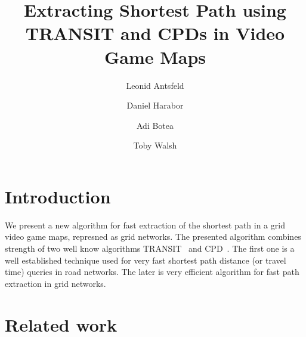 \documentclass[runningheads,a4paper]{llncs}
\begin{document}
\mainmatter  %

\title{Extracting Shortest Path using TRANSIT and CPDs in Video Game Maps}


%
%
\author{Leonid Antsfeld \and Daniel Harabor \and Adi  Botea  \and Toby Walsh}



\maketitle

\section{Introduction}
We present a new algorithm for fast extraction of the shortest path in a grid video game maps, represned as grid networks.
The presented algorithm combines strength of two well know algorithms TRANSIT~\cite{bast06} and CPD~\cite{sanka05}.
The first one is a well established technique used for very fast shortest path distance (or travel time) queries in road networks.
The later is very efficient algorithm for fast path extraction in grid networks.

\section{Related work}
\end{document}
